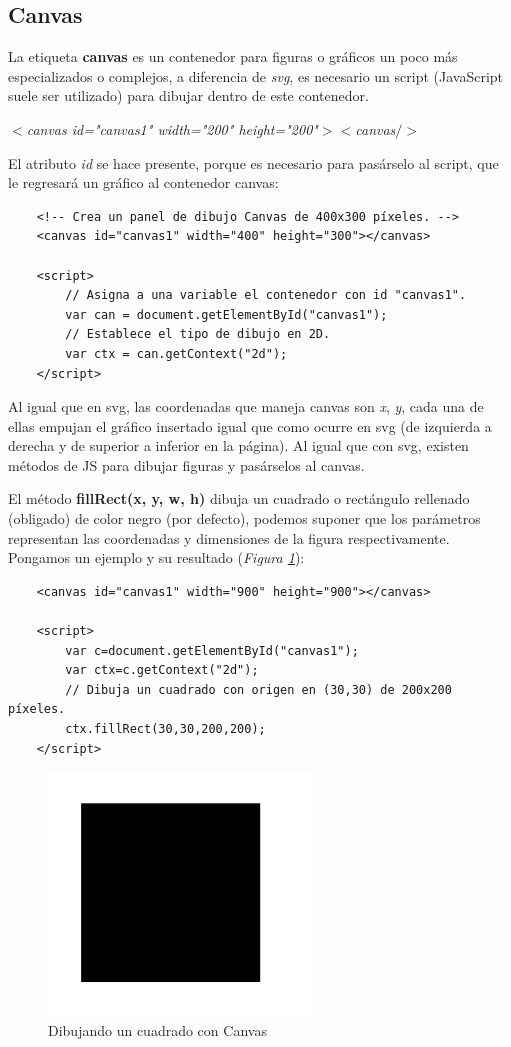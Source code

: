 \subsection{Canvas}

La etiqueta \textbf{canvas} es un contenedor para figuras o gráficos un poco más especializados o complejos, a diferencia de \textit{svg}, es necesario un script (JavaScript suele ser utilizado) para dibujar dentro de este contenedor.
\begin{center}
    \textit{$<$canvas id="canvas1" width="200" height="200"$>$$<$canvas$/>$}
\end{center}

El atributo \textit{id} se hace presente, porque es necesario para pasárselo al script, que le regresará un gráfico al contenedor canvas:
\begin{lstlisting}
    <!-- Crea un panel de dibujo Canvas de 400x300 píxeles. -->
    <canvas id="canvas1" width="400" height="300"></canvas> 

    <script>
        // Asigna a una variable el contenedor con id "canvas1".
        var can = document.getElementById("canvas1"); 
        // Establece el tipo de dibujo en 2D.
        var ctx = can.getContext("2d");
    </script>
\end{lstlisting}

Al igual que en svg, las coordenadas que maneja canvas son \textit{x}, \textit{y}, cada una de ellas empujan el gráfico insertado igual que como ocurre en svg (de izquierda a derecha y de superior a inferior en la página). Al igual que con svg, existen métodos de JS para dibujar figuras y pasárselos al canvas.

El método \textbf{fillRect(x, y, w, h)} dibuja un cuadrado o rectángulo rellenado (obligado) de color negro (por defecto), podemos suponer que los parámetros representan las coordenadas y dimensiones de la figura respectivamente. Pongamos un ejemplo y su resultado (\textit{Figura \ref{fig: 27}}):
\begin{lstlisting}
    <canvas id="canvas1" width="900" height="900"></canvas>
        
    <script>
        var c=document.getElementById("canvas1");
        var ctx=c.getContext("2d");
        // Dibuja un cuadrado con origen en (30,30) de 200x200 píxeles.
        ctx.fillRect(30,30,200,200);
    </script>
\end{lstlisting}
\begin{figure}[H]
    \centering
    \caption{Dibujando un cuadrado con Canvas}
    \label{fig: 27}
    \includegraphics[width=7cm]{ss_html/canvas.png}
\end{figure}

